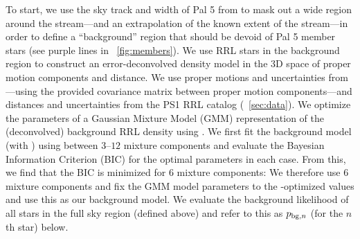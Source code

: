 \documentclass[twocolumn]{aastex63}
\begin{document}
To start, we use the sky track and width of Pal 5 from \citet{Bonaca:2019} to mask out a wide region around the stream---and an extrapolation of the known extent of the stream---in order to define a ``background'' region that should be devoid of Pal 5 member stars (see purple lines in \figurename~\ref{fig:members}).
We use RRL stars in the background region to construct an error-deconvolved density model in the 3D space of proper motion components and distance.
We use proper motions and uncertainties from \Gaia---using the provided covariance matrix between proper motion components---and distances and uncertainties from the PS1 RRL catalog (\sectionname~\ref{sec:data}).
We optimize the parameters of a Gaussian Mixture Model (GMM) representation of the (deconvolved) background RRL density using  \citep[;][]{Bovy:XD}.
We first fit the background model (with ) using between $3$--$12$ mixture components and evaluate the Bayesian Information Criterion (BIC) for the optimal parameters in each case.
From this, we find that the BIC is minimized for 6 mixture components: We therefore use 6 mixture components and fix the GMM model parameters to the -optimized values and use this as our background model.
We evaluate the background likelihood of all stars in the full sky region (defined above) and refer to this as $p_{{\rm bg}, n}$ (for the $n$th star) below.
\end{document}
